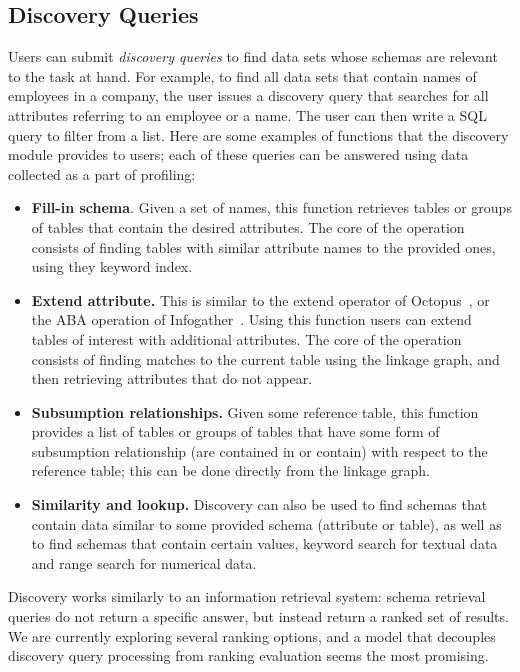 \subsection{Discovery Queries}
\label{subsec:api}

Users can submit
\emph{discovery queries} to find data sets whose schemas are relevant to the
task at hand. For example, to find all data sets that contain names of employees
in a company, the user issues a discovery query that searches for all attributes
referring to an employee or a name. The user can then write a SQL query to filter
from a list. Here are some examples of functions that the discovery module
provides to users;  each of these queries can be answered using data collected as a part of profiling:

\begin{itemize}
\item \textbf{Fill-in schema}. Given a set of names, this function retrieves 
tables or groups of tables that contain the desired attributes. The core
of the operation consists of finding tables with similar attribute names to the
provided ones, using they keyword index.

\item \textbf{Extend attribute.} This is similar to the extend operator of
Octopus~\cite{DBLP:journals/pvldb/CafarellaHK09}, or the ABA operation of
Infogather~\cite{DBLP:conf/sigmod/YakoutGCC12}. Using this function users can
extend tables of interest with additional attributes. The core of the operation
consists of finding matches to the current table using the linkage graph, and then retrieving 
attributes that do not appear.

\item \textbf{Subsumption relationships.} Given some reference table, this
function provides a list of tables or groups of tables that have some form of
subsumption relationship (\ie are contained in or contain) with respect to the
reference table;  this can be done directly from the linkage graph.

\item \textbf{Similarity and lookup.} Discovery can also be used to find schemas
that contain data similar to some provided schema (attribute or table), as well
as to find schemas that contain certain values, \ie keyword search for textual
data and range search for numerical data.  

\end{itemize}

Discovery works similarly to an information retrieval system: schema retrieval queries
do not return a specific answer, but instead return a ranked set of results. We
are currently exploring several ranking options, and a model that decouples
discovery query processing from ranking evaluation seems the most promising.


